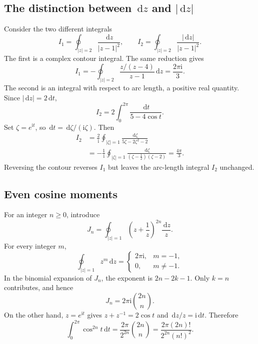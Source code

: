 \documentclass[11pt,a4paper]{article}
\theoremstyle{definition}
\theoremstyle{plain}
\newcommand{\dd}{\,\mathrm{d}}
\begin{document}
\subsection{The distinction between \texorpdfstring{$\dd z$ and $|\dd z|$}{dz and |dz|}}
Consider the two different integrals
\begin{equation}\label{eq:04}
I_1=\oint_{|z|=2}\frac{\dd z}{|z-1|^2},
 \qquad
 I_2=\oint_{|z|=2}\frac{|\dd z|}{|z-1|^2}.
\end{equation}
The first is a complex contour integral. The same reduction gives
\begin{equation}\label{eq:05}
I_1=-\oint_{|z|=2}\frac{z/(z-4)}{z-1}\dd z
     =\boxed{\frac{2\pi \mathrm{i}}{3}}.
\end{equation}
The second is an integral with respect to arc length, a positive real
quantity. Since $|\dd z|=2\dd t$,
\begin{equation}\label{eq:06}
I_2=2\int_0^{2\pi}\frac{\dd t}{5-4\cos t}.
\end{equation}
Set $\zeta=e^{\mathrm{i}t}$, so $\dd t=\dd\zeta/(\mathrm{i}\zeta)$. Then
\begin{equation}\label{eq:07}
\begin{aligned}
 I_2&=\frac{2}{\mathrm{i}}\oint_{|\zeta|=1}
             \frac{\dd\zeta}{5\zeta-2\zeta^2-2}\\
    &=-\frac{1}{\mathrm{i}}\oint_{|\zeta|=1}
             \frac{\dd\zeta}{(\zeta-\tfrac12)(\zeta-2)}
      =\boxed{\frac{4\pi}{3}}.
\end{aligned}
\end{equation}
Reversing the contour reverses $I_1$ but leaves the arc-length integral
$I_2$ unchanged.

\subsection{Even cosine moments}
For an integer $n\geq0$, introduce
\begin{equation}\label{eq:08}
J_n=\oint_{|z|=1}\left(z+\frac1z\right)^{2n}\frac{\dd z}{z}.
\end{equation}
For every integer $m$,
\begin{equation}\label{eq:09}
\oint_{|z|=1}z^m\dd z=
 \begin{cases}2\pi \mathrm{i},&m=-1,\\0,&m\neq-1.\end{cases}
\end{equation}
In the binomial expansion of $J_n$, the exponent is $2n-2k-1$.
Only $k=n$ contributes, and hence
\begin{equation}\label{eq:10}
J_n=2\pi \mathrm{i}\binom{2n}{n}.
\end{equation}
On the other hand, $z=e^{\mathrm{i}t}$ gives $z+z^{-1}=2\cos t$ and
$\dd z/z=\mathrm{i}\dd t$. Therefore
\begin{equation}\label{eq:11}
\boxed{\int_0^{2\pi}\cos^{2n}t\dd t
   =\frac{2\pi}{2^{2n}}\binom{2n}{n}
   =\frac{2\pi(2n)!}{2^{2n}(n!)^2}.}
\end{equation}
\end{document}
